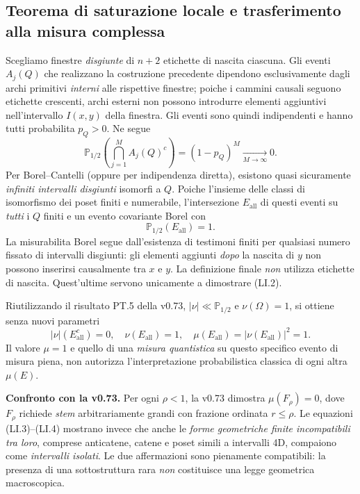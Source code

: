 \documentclass[11pt,a4paper]{article}
\begin{document}
\clearpage
\subsection*{Teorema di saturazione locale e trasferimento alla misura complessa}
Scegliamo finestre \emph{disgiunte} di $n+2$ etichette di nascita ciascuna. Gli eventi $A_j(Q)$ che realizzano la costruzione precedente dipendono esclusivamente dagli archi primitivi \emph{interni} alle rispettive finestre; poiche i cammini causali seguono etichette crescenti, archi esterni non possono introdurre elementi aggiuntivi nell'intervallo $I(x,y)$ della finestra. Gli eventi sono quindi indipendenti e hanno tutti probabilita $p_Q>0$. Ne segue
\begin{equation}
\mathbb P_{1/2}\!\left(\bigcap_{j=1}^{M}A_j(Q)^c\right)=(1-p_Q)^M\xrightarrow[M\to\infty]{}0.
\tag{LI.2}
\end{equation}
Per Borel--Cantelli (oppure per indipendenza diretta), esistono quasi sicuramente \emph{infiniti intervalli disgiunti} isomorfi a $Q$. Poiche l'insieme delle classi di isomorfismo dei poset finiti e numerabile, l'intersezione $E_{\mathrm{all}}$ di questi eventi su \emph{tutti} i $Q$ finiti e un evento covariante Borel con
\begin{equation}
\boxed{\mathbb P_{1/2}(E_{\mathrm{all}})=1.}\tag{LI.3}
\end{equation}
La misurabilita Borel segue dall'esistenza di testimoni finiti per qualsiasi numero fissato di intervalli disgiunti: gli elementi aggiunti \emph{dopo} la nascita di $y$ non possono inserirsi causalmente tra $x$ e $y$. La definizione finale \emph{non} utilizza etichette di nascita. Quest'ultime servono unicamente a dimostrare (LI.2).

Riutilizzando il risultato PT.5 della v0.73, $\lvert\nu\rvert\ll \mathbb P_{1/2}$ e $\nu(\Omega)=1$, si ottiene senza nuovi parametri
\begin{equation}
\boxed{\lvert\nu\rvert(E_{\mathrm{all}}^c)=0,\quad
\nu(E_{\mathrm{all}})=1,\quad
\mu(E_{\mathrm{all}})=\lvert\nu(E_{\mathrm{all}})\rvert^2=1.}
\tag{LI.4}
\end{equation}
Il valore $\mu=1$ e quello di una \emph{misura quantistica} su questo specifico evento di misura piena, non autorizza l'interpretazione probabilistica classica di ogni altra $\mu(E)$.

\textbf{Confronto con la v0.73.} Per ogni $\rho<1$, la v0.73 dimostra $\mu(F_\rho)=0$, dove $F_\rho$ richiede \emph{stem} arbitrariamente grandi con frazione ordinata $r\le\rho$. Le equazioni (LI.3)--(LI.4) mostrano invece che anche le \emph{forme geometriche finite incompatibili tra loro}, comprese anticatene, catene e poset simili a intervalli 4D, compaiono come \emph{intervalli isolati}. Le due affermazioni sono pienamente compatibili: la presenza di una sottostruttura rara \emph{non} costituisce una legge geometrica macroscopica.
\end{document}
